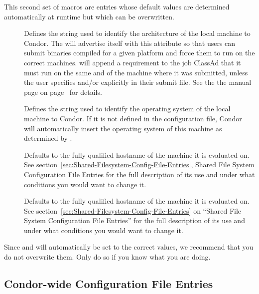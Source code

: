 This second set of macros are entries whose default values are
determined automatically at runtime but which can be overwritten.  
\begin{description}

\item[] \label{param:Arch}
  Defines the string
  used to identify the architecture of the local machine to Condor.
  The  will advertise itself with this attribute so
  that users can submit binaries compiled for a given platform and
  force them to run on the correct machines.   will
  append a requirement to the job ClassAd that it must
  run on the same  and  of the machine where
  it was submitted, unless the user specifies  and/or
   explicitly in their submit file.  See the
  the  manual page
  on page~\pageref{man-condor-submit} for details.

\item[] \label{param:OpSys}
  Defines the
  string used to identify the operating system of the local machine to
  Condor.
  If it is not defined in the configuration file, Condor will
  automatically insert the operating system of this machine as
  determined by .

\item[]
  Defaults to the fully
  qualified hostname of the machine it is evaluated on.  See
  section~\ref{sec:Shared-Filesystem-Config-File-Entries}, Shared
  File System Configuration File Entries for the full description of
  its use and under what conditions you would want to change it.

\item[]
  Defaults to the fully
  qualified hostname of the machine it is evaluated on.  See
  section~\ref{sec:Shared-Filesystem-Config-File-Entries} on ``Shared
  File System Configuration File Entries'' for the full description of
  its use and under what conditions you would want to change it.

\end{description}

Since  and  will automatically be set to the
correct values, we recommend that you do not overwrite them.
Only do so if you know what you are doing.
  
\subsection{\label{sec:Condor-wide-Config-File-Entries}
Condor-wide Configuration File Entries}

